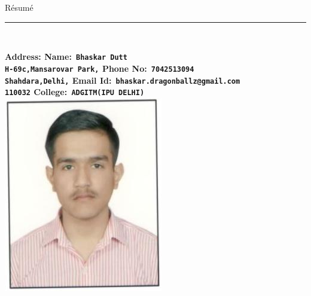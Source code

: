 \documentclass[10pt]{report}
\begin{document}
	
{\huge\hspace{210pt}R\'{e}sum\'{e}}
\\{\noindent\rule{18cm}{0.8pt}\\[4pt]}
\bf Address: \hspace{258pt}\bf Name:\verb| Bhaskar Dutt|
\\
\verb"H-69c,Mansarovar Park,"  \hspace{188pt}\bf Phone No:\verb" 7042513094"
\\{\verb"Shahdara,Delhi,"}   \hspace{226pt}\bf Email Id:\verb" bhaskar.dragonballz@gmail.com"
\\{\verb"110032"}    \hspace{272pt}\bf College:\verb" ADGITM(IPU DELHI)" \\[1pt]
	                  

{\hspace{330pt}\includegraphics[scale =0.5]{bhaskar}\\[3pt]} %
\end{document}

